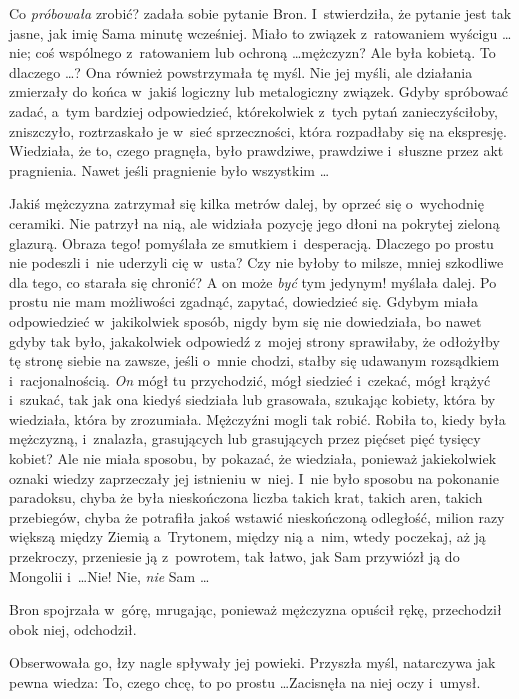 \documentclass[oneside,polish,11pt,rmheadings]{mwbk}
\begin{document}
Co \textit{próbowała }zrobić? zadała sobie pytanie Bron. I~stwierdziła, że pytanie jest tak jasne, jak imię Sama minutę wcześniej. Miało to związek z~ratowaniem wyścigu \ldots  nie; coś wspólnego z~ratowaniem lub ochroną \ldots  mężczyzn? Ale była kobietą. To dlaczego  \ldots  ? Ona również powstrzymała tę myśl. Nie jej myśli, ale działania zmierzały do końca w~jakiś logiczny lub metalogiczny związek. Gdyby spróbować zadać, a~tym bardziej odpowiedzieć, którekolwiek z~tych pytań zanieczyściłoby, zniszczyło, roztrzaskało je w~sieć sprzeczności, która rozpadłaby się na ekspresję. Wiedziała, że to, czego pragnęła, było prawdziwe, prawdziwe i~słuszne przez akt pragnienia. Nawet jeśli pragnienie było wszystkim \ldots  

Jakiś mężczyzna zatrzymał się kilka metrów dalej, by oprzeć się o~wychodnię ceramiki. Nie patrzył na nią, ale widziała pozycję jego dłoni na pokrytej zieloną glazurą. Obraza tego! pomyślała ze smutkiem i~desperacją. Dlaczego po prostu nie podeszli i~nie uderzyli cię w~usta? Czy nie byłoby to milsze, mniej szkodliwe dla tego, co starała się chronić? A on może \textit{być }tym jedynym! myślała dalej. Po prostu nie mam możliwości zgadnąć, zapytać, dowiedzieć się. Gdybym miała odpowiedzieć w~jakikolwiek sposób, nigdy bym się nie dowiedziała, bo nawet gdyby tak było, jakakolwiek odpowiedź z~mojej strony sprawiłaby, że odłożyłby tę stronę siebie na zawsze, jeśli o~mnie chodzi, stałby się udawanym rozsądkiem i~racjonalnością. \textit{On} mógł tu przychodzić, mógł siedzieć i~czekać, mógł krążyć i~szukać, tak jak ona kiedyś siedziała lub grasowała, szukając kobiety, która by wiedziała, która by zrozumiała. Mężczyźni mogli tak robić. Robiła to, kiedy była mężczyzną, i~znalazła, grasujących lub grasujących przez pięćset pięć tysięcy kobiet? Ale nie miała sposobu, by pokazać, że wiedziała, ponieważ jakiekolwiek oznaki wiedzy zaprzeczały jej istnieniu w~niej. I~nie było sposobu na pokonanie paradoksu, chyba że była nieskończona liczba takich krat, takich aren, takich przebiegów, chyba że potrafiła jakoś wstawić nieskończoną odległość, milion razy większą między Ziemią a~Trytonem, między nią a~nim, wtedy poczekaj, aż ją przekroczy, przeniesie ją z~powrotem, tak łatwo, jak Sam przywiózł ją do Mongolii i~\ldots  Nie! Nie, \textit{nie }Sam \ldots  

Bron spojrzała w~górę, mrugając, ponieważ mężczyzna opuścił rękę, przechodził obok niej, odchodził. 

Obserwowała go, łzy nagle spływały jej powieki. Przyszła myśl, natarczywa jak pewna wiedza: To, czego chcę, to po prostu \ldots  Zacisnęła na niej oczy i~umysł. 
\end{document}
